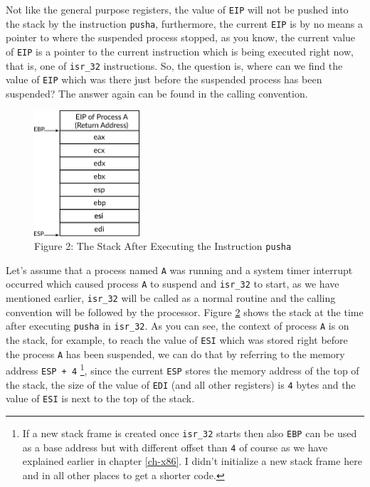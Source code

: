 Not like the general purpose registers, the value of \lstinline!EIP!
will not be pushed into the stack by the instruction \lstinline!pusha!,
furthermore, the current \lstinline!EIP! is by no means a pointer to
where the suspended process stopped, as you know, the current value of
\lstinline!EIP! is a pointer to the current instruction which is being
executed right now, that is, one of \lstinline!isr_32! instructions. So,
the question is, where can we find the value of \lstinline!EIP! which
was there just before the suspended process has been suspended? The
answer again can be found in the calling convention.

\hypertarget{fig:21092021_1}{
\begin{figure}
\centering
\includegraphics[width=0.35000\textwidth]{Figures/process-ch/Fig21092021_1.png}
\caption{Figure 2: The Stack After Executing the Instruction
\lstinline!pusha!}\label{fig:21092021_1}
\end{figure}
}

Let's assume that a process named \lstinline!A! was running and a system
timer interrupt occurred which caused process \lstinline!A! to suspend
and \lstinline!isr_32! to start, as we have mentioned earlier,
\lstinline!isr_32! will be called as a normal routine and the calling
convention will be followed by the processor. Figure
\protect\hyperlink{fig:21092021_1}{2} shows the stack at the time after
executing \lstinline!pusha! in \lstinline!isr_32!. As you can see, the
context of process \lstinline!A! is on the stack, for example, to reach
the value of \lstinline!ESI! which was stored right before the process
\lstinline!A! has been suspended, we can do that by referring to the
memory address \lstinline!ESP + 4! \footnote{If a new stack frame is
  created once \lstinline!isr_32! starts then also \lstinline!EBP! can
  be used as a base address but with different offset than \lstinline!4!
  of course as we have explained earlier in chapter \ref{ch-x86}. I
  didn't initialize a new stack frame here and in all other places to
  get a shorter code.}, since the current \lstinline!ESP! stores the
memory address of the top of the stack, the size of the value of
\lstinline!EDI! (and all other registers) is \lstinline!4! bytes and the
value of \lstinline!ESI! is next to the top of the stack.


